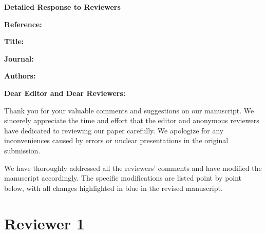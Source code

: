 \documentclass[12pt]{article}
\begin{document}

\begin{center}
{\Large \textbf{Detailed Response to Reviewers}}
\end{center}

\bigskip


\textbf{Reference:} \manuscriptNumer

\textbf{Title:} \myTitle

\textbf{Journal:} \journalName

\textbf{Authors:} \allAuthorName

\bigskip


\textbf{Dear Editor \editorName and Dear Reviewers:}

Thank you for your valuable comments and suggestions on our manuscript. We sincerely appreciate the time and effort that the editor and anonymous reviewers have dedicated to reviewing our paper carefully. We apologize for any inconveniences caused by errors or unclear presentations in the original submission. 

We have thoroughly addressed all the reviewers' comments and have modified the manuscript accordingly. The specific modifications are listed point by point below, with all changes highlighted in blue in the revised manuscript.


\section*{Reviewer 1}
\end{document}
